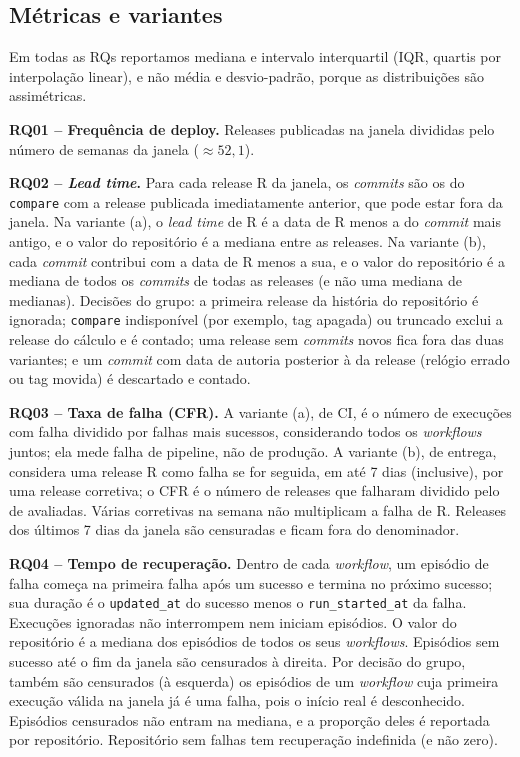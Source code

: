 \subsection{Métricas e variantes}
\label{sec:metricas}

Em todas as RQs reportamos mediana e intervalo interquartil (IQR, quartis por
interpolação linear), e não média e desvio-padrão, porque as distribuições são
assimétricas.

\textbf{RQ01 -- Frequência de deploy.} Releases publicadas na janela divididas
pelo número de semanas da janela ($\approx 52{,}1$).

\textbf{RQ02 -- \textit{Lead time}.} Para cada release R da janela, os
\textit{commits} são os do \texttt{compare} com a release publicada
imediatamente anterior, que pode estar fora da janela. Na variante (a), o
\textit{lead time} de R é a data de R menos a do \textit{commit} mais antigo, e o
valor do repositório é a mediana entre as releases. Na variante (b), cada
\textit{commit} contribui com a data de R menos a sua, e o valor do repositório é
a mediana de todos os \textit{commits} de todas as releases (e não uma mediana de
medianas). Decisões do grupo: a primeira release da história do repositório é
ignorada; \texttt{compare} indisponível (por exemplo, tag apagada) ou truncado
exclui a release do cálculo e é contado; uma release sem \textit{commits} novos
fica fora das duas variantes; e um \textit{commit} com data de autoria posterior
à da release (relógio errado ou tag movida) é descartado e contado.

\textbf{RQ03 -- Taxa de falha (CFR).} A variante (a), de CI, é o número de
execuções com falha dividido por falhas mais sucessos, considerando todos os
\textit{workflows} juntos; ela mede falha de pipeline, não de produção. A
variante (b), de entrega, considera uma release R como falha se for seguida, em
até 7 dias (inclusive), por uma release corretiva; o CFR é o número de releases
que falharam dividido pelo de avaliadas. Várias corretivas na semana não
multiplicam a falha de R. Releases dos últimos 7 dias da janela são censuradas e
ficam fora do denominador.

\textbf{RQ04 -- Tempo de recuperação.} Dentro de cada \textit{workflow}, um
episódio de falha começa na primeira falha após um sucesso e termina no próximo
sucesso; sua duração é o \texttt{updated\_at} do sucesso menos o
\texttt{run\_started\_at} da falha. Execuções ignoradas não interrompem nem
iniciam episódios. O valor do repositório é a mediana dos episódios de todos os
seus \textit{workflows}. Episódios sem sucesso até o fim da janela são
censurados à direita. Por decisão do grupo, também são censurados (à esquerda)
os episódios de um \textit{workflow} cuja primeira execução válida na janela já
é uma falha, pois o início real é desconhecido. Episódios censurados não entram
na mediana, e a proporção deles é reportada por repositório. Repositório sem
falhas tem recuperação indefinida (e não zero).

